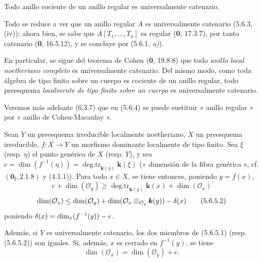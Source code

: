 \begin{proposition}[5.6.4]
\label{IV.2.s5.6.4-fr}
Todo anillo cociente de un anillo regular es universalmente catenario.
\end{proposition}

Todo se reduce a ver que un anillo regular $A$ es universalmente catenario
(5.6.3, (iv)); ahora bien, se sabe que $A[T_1,\ldots,T_n]$ es regular (\textbf 0, 17.3.7),
por tanto catenario (\textbf 0, 16.5.12), y se concluye por (5.6.1, \emph{a)}).

En particular, se sigue del teorema de Cohen (\textbf 0, 19.8.8) que todo \emph{anillo
local noetheriano completo} es universalmente catenario. Del mismo modo, como
toda álgebra de tipo finito sobre un cuerpo es cociente de un anillo regular,
todo preesquema \emph{localmente de tipo finito sobre un cuerpo} es universalmente
catenario.

Veremos más adelante (6.3.7) que en (5.6.4) se puede sustituir « anillo
regular » por « anillo de Cohen-Macaulay ».

\begin{proposition}[5.6.5]
Sean $Y$ un preesquema irreducible localmente noetheriano, $X$ un preesquema
irreducible, $f:X\to Y$ un morfismo dominante localmente de tipo finito. Sea
$\xi$ \textup{(resp. $\eta$)} el punto genérico de $X$ \textup{(resp. $Y$)}, y sea
$e=\dim(f^{-1}(\eta))=\operatorname{deg.tr}_{\mathbf{k}(\eta)}\boldsymbol{k}(\xi)$
\textup{(« dimensión de la fibra genérica », cf. $(\mathbf{0}_{\mathrm I},2.1.8)$ y
(4.1.1))}. Para todo $x\in X$, se tiene entonces, poniendo $y=f(x)$,
\begin{equation}
e+\dim(\mathcal O_y)
\geq\operatorname{deg.tr}_{\mathbf{k}(y)}\boldsymbol{k}(x)+\dim(\mathcal O_x)
\tag{5.6.5.1}\label{IV.2.s5.6.5.1-fr}
\end{equation}
\begin{equation}
\dim(\mathcal O_x)
\leq\dim(\mathcal O_y)
+\dim(\mathcal O_x\otimes_{\mathcal O_y}\boldsymbol{k}(y))-\delta(x)
\tag{5.6.5.2}\label{IV.2.s5.6.5.2-fr}
\end{equation}
poniendo $\delta(x)=\dim_x(f^{-1}(y))- e$.

Además, si $Y$ es universalmente catenario, los dos miembros de
\textup{(5.6.5.1) (resp. (5.6.5.2))} son iguales. Si, además, $x$ es cerrado en
$f^{-1}(y)$, se tiene
\begin{equation}
\dim(\mathcal O_x)=\dim(\mathcal O_y)+e.
\tag{5.6.5.3}\label{IV.2.s5.6.5.3-fr}
\end{equation}
\end{proposition}

